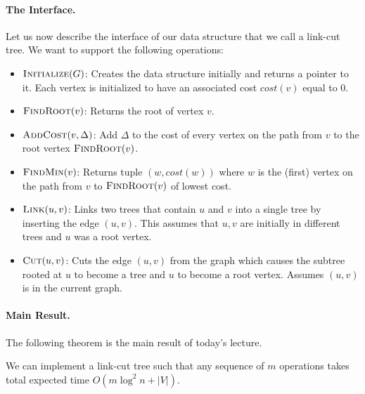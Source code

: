\paragraph{The Interface.} Let us now describe the interface of our data structure that we call a link-cut tree. We want to support the following operations:
\begin{itemize}
    \item $\textsc{Initialize}(G)$: Creates the data structure initially and returns a pointer to it. Each vertex is initialized to have an associated cost $cost(v)$ equal to $0$.
    \item $\textsc{FindRoot}(v)$: Returns the root of vertex $v$. 
    \item $\textsc{AddCost}(v, \Delta)$: Add $\Delta$ to the cost of every vertex on the path from $v$ to the root vertex $\textsc{FindRoot}(v)$.
    \item $\textsc{FindMin}(v)$: Returns tuple $(w, cost(w))$ where $w$ is the (first) vertex on the path from $v$ to $\textsc{FindRoot}(v)$ of lowest cost. 
    \item $\textsc{Link}(u,v)$: Links two trees that contain $u$ and $v$ into a single tree by inserting the edge $(u,v)$. This assumes that $u, v$ are initially in different trees and $u$ was a root vertex.
    \item $\textsc{Cut}(u,v)$: Cuts the edge $(u,v)$ from the graph which causes the subtree rooted at $u$ to become a tree and $u$ to become a root vertex. Assumes $(u,v)$ is in the current graph.
\end{itemize}

\paragraph{Main Result.} The following theorem is the main result of today's lecture.

\begin{theorem}\label{thm:mainTheoremLinkCutTree}
We can implement a link-cut tree such that any sequence of $m$ operations takes total expected time $O(m \log^2 n + |V|)$.
\end{theorem}



